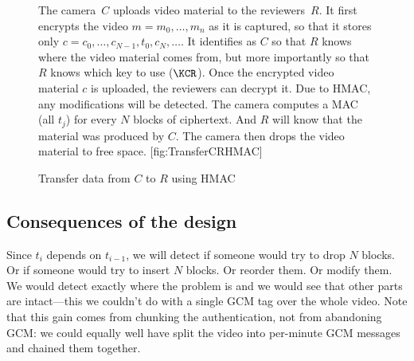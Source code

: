 \begin{figure}
  \begin{sidecaption}
    {%
      The camera~\(C\) uploads video material to the reviewers~\(R\).
      It first encrypts the video \(m = m_0, \ldots, m_n\) as it is captured,
      so that it stores only \(c = c_0, \ldots, c_{N-1}, t_0, c_N, \ldots\).
      It identifies as \(C\) so that \(R\) knows where the video material
      comes from, but more importantly so that \(R\) knows which key to use
      (\(\KCR\)).
      Once the encrypted video material \(c\) is uploaded, the reviewers can 
      decrypt it.
      Due to HMAC, any modifications will be detected.
      The camera computes a MAC (all \(t_j\)) for every \(N\) blocks of 
      ciphertext.
      And \(R\) will know that the material was produced by \(C\).
      The camera then drops the video material to free space.
    }[fig:TransferCRHMAC]
  \flushright
  \begin{msc}
    [/msc/action width=0.4\linewidth]
    {Transfer data from \(C\) to \(R\) using HMAC}
      \nextlevel[6]
      \nextlevel[2]
      \nextlevel
      \nextlevel
  \end{msc}
  \end{sidecaption}
\end{figure}

\subsection{Consequences of the design}

Since \(t_i\) depends on \(t_{i-1}\), we will detect if someone would try to 
drop \(N\) blocks.
Or if someone would try to insert \(N\) blocks.
Or reorder them.
Or modify them.
We would detect exactly where the problem is and we would see that other
parts are intact---this we couldn't do with a single \ac{GCM} tag over the
whole video.
Note that this gain comes from chunking the authentication, not from
abandoning \ac{GCM}: we could equally well have split the video into
per-minute \ac{GCM} messages and chained them together.

